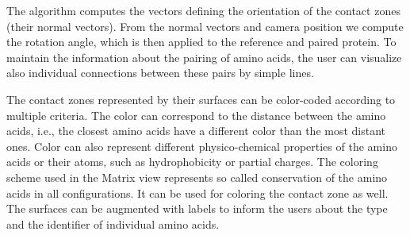 \documentclass{bmcart}
\def\ExpView {Exploded view\xspace}
\def\MatView {Matrix view\xspace}
\begin{document}
The algorithm computes the vectors defining the orientation of the contact zones (their normal vectors). 
From the normal vectors and camera position we compute the rotation angle, which is then applied to the reference and paired protein.
To maintain the information about the pairing of amino acids, the user can visualize also individual connections between these pairs by simple lines.


The contact zones represented by their surfaces can be color-coded according to multiple criteria.
The color can correspond to the distance between the amino acids, i.e., the closest amino acids have a different color than the most distant ones.
Color can also represent different physico-chemical properties of the amino acids or their atoms, such as hydrophobicity or partial charges.
The coloring scheme used in the \MatView represents so called conservation of the amino acids in all configurations.
It can be used for coloring the contact zone as well.
The surfaces can be augmented with labels to inform the users about the type and the identifier of individual amino acids.
\end{document}
